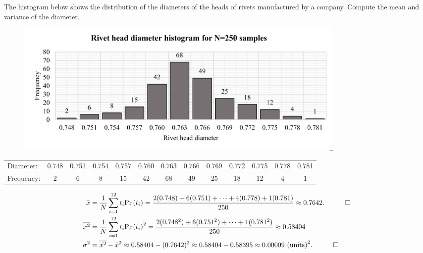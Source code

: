 \begin{hwkProblem}{2}{}

	The histogram below shows the distribution of the diameters of the heads of rivets manufactured by a company. Compute the mean and variance of the diameter.
	\begin{figure}[H]
	  \centering
	  \includegraphics[width=0.8\textwidth]{./images/p02.png}
	\end{figure}
	\begin{center}
		\begin{tabular}{lcccccccccccc}
			Diameter: & 0.748 & 0.751 & 0.754 & 0.757 & 0.760 & 0.763 & 0.766 & 0.769 & 0.772 & 0.775 & 0.778 & 0.781 \\
			Frequency: & 2 & 6 & 8 & 15 & 42 & 68 & 49 & 25 & 18 & 12 & 4 & 1
		\end{tabular}
	\end{center}

	\hwkSol

	\begin{align*}
		\bar{x} &= \frac{1}{N}\sum_{i=1}^{12} t_{i}\Prob[t_{i}] = \frac{2(0.748)+6(0.751)+\cdots+4(0.778)+1(0.781)}{250} \approx 0.7642. \quad \qed \\
		\overline{x^2} &= \frac{1}{N}\sum_{i=1}^{12} t_{i}\Prob[t_{i}]^{2} = \frac{2(0.748^2)+6(0.751^2)+\cdots+1(0.781^2)}{250} \approx 0.58404 \\
		\sigma^2 &= \overline{x^2} - \bar{x}^2 \approx 0.58404 - (0.7642)^2 \approx 0.58404 - 0.58395 \approx 0.00009 \text{ (units)}^{2}. \quad \qed
	\end{align*}

\end{hwkProblem}

